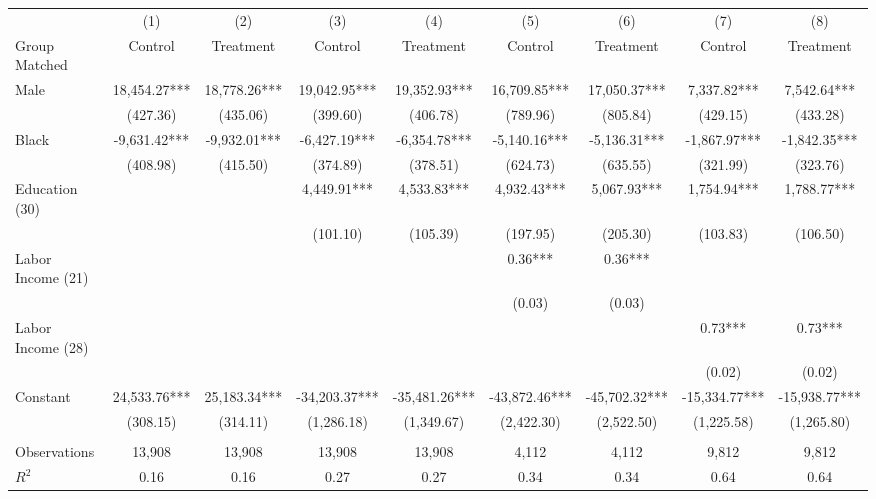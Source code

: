 \begin{tabular}{lcccccccc} \toprule
 & (1) & (2) & (3) & (4) & (5) & (6) & (7) & (8) \\ 
Group Matched & Control & Treatment & Control & Treatment & Control & Treatment & Control & Treatment \\ \midrule
Male & 18,454.27*** & 18,778.26*** & 19,042.95*** & 19,352.93*** & 16,709.85*** & 17,050.37*** & 7,337.82*** & 7,542.64*** \\
 & (427.36) & (435.06) & (399.60) & (406.78) & (789.96) & (805.84) & (429.15) & (433.28) \\
Black & -9,631.42*** & -9,932.01*** & -6,427.19*** & -6,354.78*** & -5,140.16*** & -5,136.31*** & -1,867.97*** & -1,842.35*** \\
 & (408.98) & (415.50) & (374.89) & (378.51) & (624.73) & (635.55) & (321.99) & (323.76) \\
Education (30) &  &  & 4,449.91*** & 4,533.83*** & 4,932.43*** & 5,067.93*** & 1,754.94*** & 1,788.77*** \\
 &  &  & (101.10) & (105.39) & (197.95) & (205.30) & (103.83) & (106.50) \\
Labor Income (21) &  &  &  &  & 0.36*** & 0.36*** &  &  \\
 &  &  &  &  & (0.03) & (0.03) &  &  \\
Labor Income (28) &  &  &  &  &  &  & 0.73*** & 0.73*** \\
 &  &  &  &  &  &  & (0.02) & (0.02) \\
Constant & 24,533.76*** & 25,183.34*** & -34,203.37*** & -35,481.26*** & -43,872.46*** & -45,702.32*** & -15,334.77*** & -15,938.77*** \\
 & (308.15) & (314.11) & (1,286.18) & (1,349.67) & (2,422.30) & (2,522.50) & (1,225.58) & (1,265.80) \\ \\ \midrule 
 Observations & 13,908 & 13,908 & 13,908 & 13,908 & 4,112 & 4,112 & 9,812 & 9,812 \\
$R^2$ & 0.16 & 0.16 & 0.27 & 0.27 & 0.34 & 0.34 & 0.64 & 0.64 \\ \bottomrule
\end{tabular}
